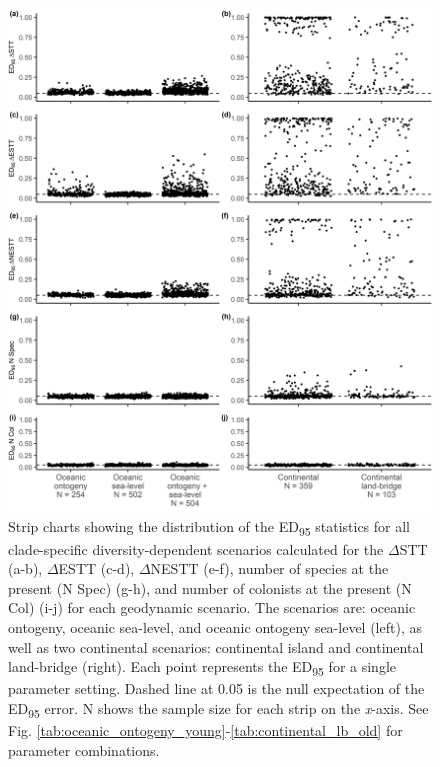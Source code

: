 \begin{figure}
    \centering
    \includegraphics[width=\textwidth]{facet_scenario_cs.png}
    \caption{Strip charts showing the distribution of the ED\textsubscript{95} statistics for all clade-specific diversity-dependent scenarios calculated for the $\Delta$STT (a-b), $\Delta$ESTT (c-d), $\Delta$NESTT (e-f), number of species at the present (N Spec) (g-h), and number of colonists at the present (N Col) (i-j) for each geodynamic scenario. The scenarios are: oceanic ontogeny, oceanic sea-level, and oceanic ontogeny sea-level (left), as well as two continental scenarios: continental island and continental land-bridge (right). Each point represents the ED\textsubscript{95} for a single parameter setting. Dashed line at 0.05 is the null expectation of the ED\textsubscript{95} error. N shows the sample size for each strip on the \textit{x}-axis. See Fig. \ref{tab:oceanic_ontogeny_young}-\ref{tab:continental_lb_old} for parameter combinations.}
    \label{fig:facet_scenario_cs}
\end{figure}

